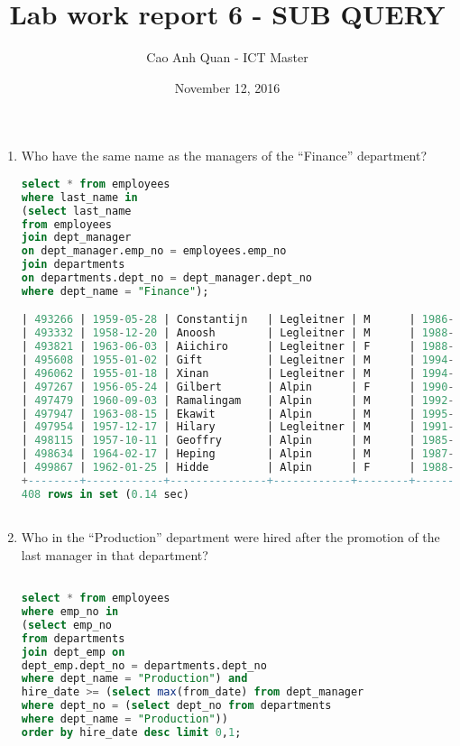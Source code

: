\documentclass[12pt]{article}
\title{Lab work report 6 - SUB QUERY}
\author{Cao Anh Quan - ICT Master}
\date{November 12, 2016}
\begin{document}
 
\begin{titlepage}
\maketitle
\end{titlepage}

\begin{enumerate}



\item Who have the same name as the managers of the “Finance” department?
\begin{lstlisting}[language=SQL]
select * from employees 
where last_name in 
(select last_name
from employees 
join dept_manager
on dept_manager.emp_no = employees.emp_no
join departments 
on departments.dept_no = dept_manager.dept_no
where dept_name = "Finance");

| 493266 | 1959-05-28 | Constantijn   | Legleitner | M      | 1986-05-25 |
| 493332 | 1958-12-20 | Anoosh        | Legleitner | M      | 1988-11-10 |
| 493821 | 1963-06-03 | Aiichiro      | Legleitner | F      | 1988-04-07 |
| 495608 | 1955-01-02 | Gift          | Legleitner | M      | 1994-04-28 |
| 496062 | 1955-01-18 | Xinan         | Legleitner | M      | 1994-05-02 |
| 497267 | 1956-05-24 | Gilbert       | Alpin      | F      | 1990-07-21 |
| 497479 | 1960-09-03 | Ramalingam    | Alpin      | M      | 1992-05-03 |
| 497947 | 1963-08-15 | Ekawit        | Alpin      | M      | 1995-06-29 |
| 497954 | 1957-12-17 | Hilary        | Legleitner | M      | 1991-08-07 |
| 498115 | 1957-10-11 | Geoffry       | Alpin      | M      | 1985-10-01 |
| 498634 | 1964-02-17 | Heping        | Alpin      | M      | 1987-12-14 |
| 499867 | 1962-01-25 | Hidde         | Alpin      | F      | 1988-10-13 |
+--------+------------+---------------+------------+--------+------------+
408 rows in set (0.14 sec)



\end{lstlisting}

\item Who in the “Production” department were hired after the promotion of the last
 manager in that department?
 \begin{lstlisting}[language=SQL]

select * from employees 
where emp_no in 
(select emp_no 
from departments
join dept_emp on
dept_emp.dept_no = departments.dept_no
where dept_name = "Production") and
hire_date >= (select max(from_date) from dept_manager
where dept_no = (select dept_no from departments
where dept_name = "Production"))
order by hire_date desc limit 0,1;


\end{lstlisting}
\end{enumerate}
\end{document}

